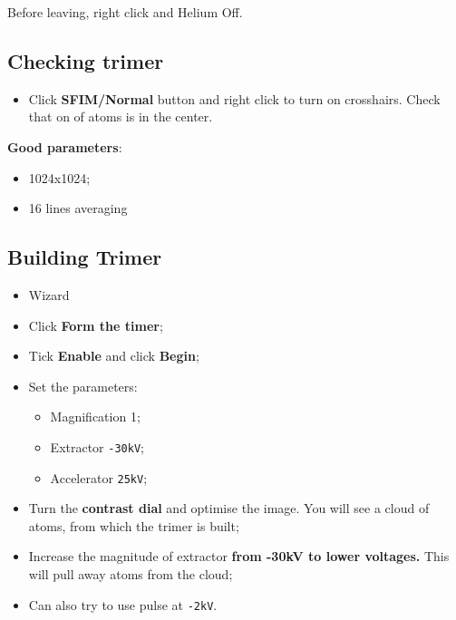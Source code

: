 \begin{framed}\noindent
  Before leaving, right click and Helium Off.
\end{framed}

\subsection{Checking trimer}
\begin{itemize}
\item   Click  \textbf{SFIM/Normal}   button  and   right  click   to  turn   on
  crosshairs. Check that on of atoms is in the center.
\end{itemize}

\begin{framed}\noindent
  \textbf{Good parameters}:
  \begin{itemize}
  \item 1024x1024;
  \item 16 lines averaging
  \end{itemize}
\end{framed}

\subsection{Building Trimer}
\label{sec:building-trimer}

\begin{itemize}
\item Wizard
\item Click \textbf{Form the timer};
\item Tick \textbf{Enable} and click \textbf{Begin};
\item Set the parameters:
  \begin{itemize}
  \item Magnification 1;
  \item Extractor \texttt{-30kV};
  \item Accelerator \texttt{25kV};
  \end{itemize}
\item Turn  the \textbf{contrast dial}  and optimise the  image. You will  see a
  cloud of atoms, from which the trimer is built;
\item Increase the magnitude of extractor \textbf{from -30kV to lower voltages.}
  This  will pull  away atoms  from the  cloud; 
\item Can also try to use pulse at \texttt{-2kV}.
\end{itemize}

